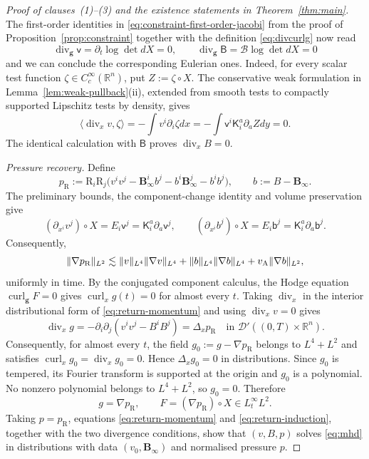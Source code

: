\documentclass[11pt,reqno]{amsart}
\theoremstyle{plain}
\theoremstyle{definition}
\theoremstyle{remark}
\numberwithin{equation}{section}
\DeclareMathOperator{\Div}{div}
\DeclareMathOperator{\curl}{curl}
\newcommand{\Kmat}{\mathsf K}
\newcommand{\vLag}{\mathsf v}
\newcommand{\BLag}{\mathsf B}
\newcommand{\bLag}{\mathsf b}
\newcommand{\gmetric}{\mathbf g}
\newcommand{\Binf}{\mathbf B_\infty}
\newcommand{\Real}{\mathbb R}
\newcommand{\Rn}{\Real^n}
\newcommand{\Riesz}{\mathrm R}
\begin{document}
\begin{proof}[Proof of clauses~\textup{(1)}--\textup{(3)} and the existence
statements in Theorem~\ref{thm:main}]
The first-order identities in \eqref{eq:constraint-first-order-jacobi} from the proof of Proposition~\ref{prop:constraint} together with the definition \eqref{eq:divcurlg} now read
\[
 \Div_{\gmetric}\vLag=\partial_t\log\det dX=0,\qquad
 \Div_{\gmetric}\BLag=\mathcal B\log\det dX=0
\]
and we can conclude the corresponding Eulerian ones. Indeed, for every scalar
test function $\zeta\in C_c^\infty(\Rn)$, put $Z:=\zeta\circ X$. The
conservative weak formulation in Lemma~\ref{lem:weak-pullback}(ii), extended
from smooth tests to compactly supported Lipschitz tests by density, gives
\begin{equation}\label{eq:diveulerian}
    \langle\Div_xv,\zeta\rangle
 =-\int v^i\partial_i\zeta dx
 =-\int \vLag^i\Kmat_i^a\partial_aZ dy=0.
\end{equation}
The identical calculation with $\BLag$ proves $\Div_xB=0$.

\emph{Pressure recovery.}
Define
\begin{equation}\label{eq:return-pressure}
 p_{\mathrm R}:=\Riesz_i\Riesz_j
 \big(v^iv^j-\Binf^ib^j-b^i\Binf^j-b^ib^j\big),
 \qquad b:=B-\Binf.
\end{equation}
The preliminary bounds, the component-change identity and volume preservation
give
\[
 (\partial_{x^i}v^j)\circ X
 =E_i\vLag^j=\Kmat_i^a\partial_a\vLag^j,
 \qquad
 (\partial_{x^i}b^j)\circ X
 =E_i\bLag^j=\Kmat_i^a\partial_a\bLag^j.
\]
Consequently,
\[
 \|\nabla p_{\mathrm R}\|_{L^2}
 \lesssim\|v\|_{L^4}\|\nabla v\|_{L^4}
 +\|b\|_{L^4}\|\nabla b\|_{L^4}
 +v_{\rm A}\|\nabla b\|_{L^2},
\]
uniformly in time. By the conjugated component calculus, the Hodge equation
$\curl_{\gmetric}F=0$ gives $\curl_xg(t)=0$ for almost every $t$. Taking
$\Div_x$ in the interior distributional form of \eqref{eq:return-momentum}
and using $\Div_xv=0$ gives
\[
 \Div_xg
 =-\partial_i\partial_j(v^iv^j-B^iB^j)
 =\Delta_xp_{\mathrm R}
 \quad\text{in }\mathcal D'((0,T)\times\Rn).
\]
Consequently, for almost every $t$, the field
$g_0:=g-\nabla p_{\mathrm R}$ belongs to $L^4+L^2$ and satisfies
$\curl_xg_0=\Div_xg_0=0$. Hence $\Delta_xg_0=0$ in distributions. Since
$g_0$ is tempered, its Fourier transform is supported at the origin and
$g_0$ is a polynomial. No nonzero polynomial belongs to $L^4+L^2$, so
$g_0=0$. Therefore
\begin{equation}\label{eq:return-force}
 g=\nabla p_{\mathrm R},\qquad
 F=(\nabla p_{\mathrm R})\circ X\in L^\infty_tL^2.
\end{equation}
Taking $p=p_{\mathrm R}$, equations \eqref{eq:return-momentum} and
\eqref{eq:return-induction}, together with the two divergence conditions,
show that $(v,B,p)$ solves \eqref{eq:mhd} in distributions with data
$(v_0,\Binf)$ and normalised pressure $p$.


\end{proof}
\end{document}
